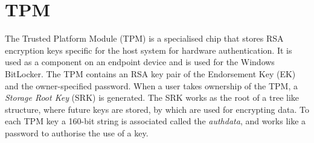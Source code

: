 \section{TPM} %
The Trusted Platform Module (TPM) is a specialised chip that stores RSA encryption keys specific for the host system for hardware authentication. It is used as a component on an endpoint device and is used for the Windows BitLocker.
The TPM contains an RSA key pair of the Endorsement Key (EK) and the owner-specified password. When a user takes ownership of the TPM, a \textit{Storage Root Key} (SRK) is generated. The SRK works as the root of a tree like structure, where future keys are stored, by which are used for encrypting data. To each TPM key a 160-bit string is associated called the \textit{authdata}, and works like a password to authorise the use of a key. \\ \\

